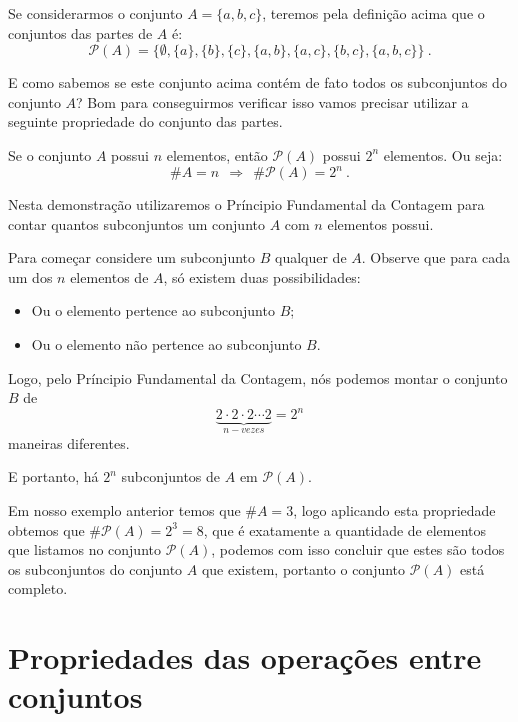  \begin{exem}
 Se considerarmos o conjunto $A= \{a, b, c\}$, teremos pela definição acima que o conjuntos das partes de $A$ é:
 \[\mathcal{P}(A)= \{ \emptyset, \{a\}, \{b\}, \{c\}, \{a, b\}, \{a, c\}, \{b, c\}, \{a, b, c\} \} \ .\] 
 \end{exem}
 
 E como sabemos se este conjunto acima contém de fato todos os subconjuntos do conjunto $A$? Bom para conseguirmos verificar isso vamos precisar utilizar a seguinte propriedade do conjunto das partes.
 
 \begin{prop}
  Se o conjunto $A$ possui $n$ elementos, então $\mathcal{P}(A)$ possui $2^n$ elementos. Ou seja:
  \[\# A= n \ \ \Rightarrow \ \ \# \mathcal{P}(A)= 2^n \ .\] 
\end{prop}

 \begin{dem}
 Nesta demonstração utilizaremos o Príncipio Fundamental da Contagem para contar quantos subconjuntos um conjunto $A$ com $n$ elementos possui. 

 Para começar considere um subconjunto $B$ qualquer de $A$. Observe que para cada um dos $n$ elementos de $A$, só existem duas possibilidades:
 \begin{itemize}
 \item Ou o elemento pertence ao subconjunto $B$;
 \item Ou o elemento não pertence ao subconjunto $B$.
 \end{itemize}

 Logo, pelo Príncipio Fundamental da Contagem, nós podemos montar o conjunto $B$ de 
 \[\underbrace{2 \cdot 2 \cdot 2 \cdots 2}_{n-vezes}= 2^n\]
 maneiras diferentes.

 E portanto, há $2^n$ subconjuntos de $A$ em $\mathcal{P}(A)$.
 \end{dem}

 Em nosso exemplo anterior temos que $\# A= 3$, logo aplicando esta propriedade obtemos que $\# \mathcal{P}(A)= 2^3= 8$, que é exatamente a quantidade de elementos que listamos no conjunto $\mathcal{P}(A)$, podemos com isso concluir que estes são todos os subconjuntos do conjunto $A$ que existem, portanto o conjunto $\mathcal{P}(A)$ está completo.
 


 \newpage
 \section{Propriedades das operações entre conjuntos}

